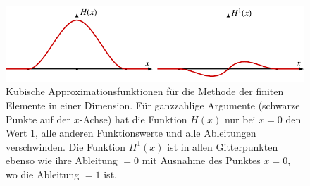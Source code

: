 %
%
%
\begin{figure}
\centering
\includegraphics{chapters/090-pdenumerik/images/kubisch.pdf}
\caption{Kubische Approximationsfunktionen für die Methode der
finiten Elemente in einer Dimension.
Für ganzzahlige Argumente (schwarze Punkte auf der $x$-Achse)
hat die Funktion $H(x)$ nur bei $x=0$ den Wert $1$, alle anderen
Funktionswerte und alle Ableitungen verschwinden.
Die Funktion $H^1(x)$ ist in allen Gitterpunkten ebenso wie
ihre Ableitung $=0$ mit Ausnahme des Punktes $x=0$, wo die
Ableitung $=1$ ist.
\label{buch:pdenumerik:fem:fig:kubisch}}
\end{figure}
